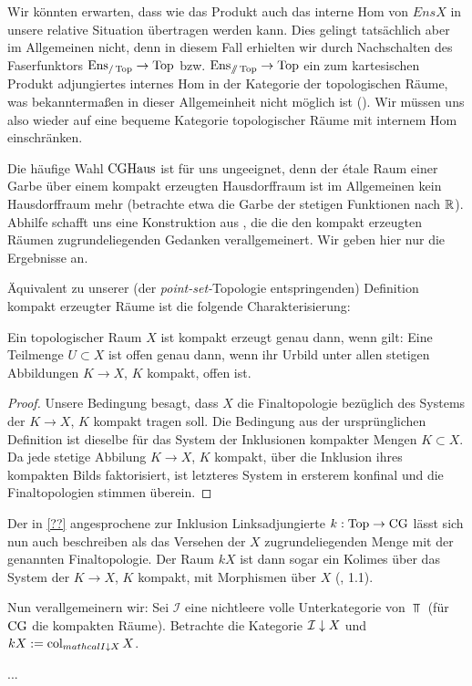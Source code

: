 Wir könnten erwarten, dass wie das Produkt auch das interne Hom von
$EnsX$ in unsere relative Situation übertragen werden kann. Dies
gelingt tatsächlich aber im Allgemeinen nicht, denn in diesem Fall
erhielten wir durch Nachschalten des Faserfunktors $\operatorname{Ens}_{/\operatorname{Top}} \to
\operatorname{Top}$ bzw. $\operatorname{Ens}_{\mathbin{/\mkern-6mu/} \operatorname{Top}} \to \operatorname{Top}$ ein zum kartesischen Produkt
adjungiertes internes Hom in der Kategorie der topologischen Räume,
was bekanntermaßen in dieser Allgemeinheit nicht möglich ist
(\cite{???}). Wir müssen uns also wieder auf eine bequeme Kategorie
topologischer Räume mit internem Hom einschränken.

Die häufige Wahl $\operatorname{CGHaus}$ ist für uns ungeeignet, denn der étale Raum
einer Garbe über einem kompakt erzeugten Hausdorffraum ist im
Allgemeinen kein Hausdorffraum mehr (betrachte etwa die Garbe der
stetigen Funktionen nach $\mathbb{R}$). Abhilfe schafft uns eine Konstruktion
aus \cite{Vogt}, die die den kompakt erzeugten Räumen
zugrundeliegenden Gedanken verallgemeinert. Wir geben hier nur die
Ergebnisse an.

Äquivalent zu unserer (der \emph{point-set-}Topologie entspringenden)
Definition kompakt erzeugter Räume ist die folgende Charakterisierung:
\begin{lemma}
  Ein topologischer Raum $X$ ist kompakt erzeugt genau dann, wenn
  gilt: Eine Teilmenge $U \subset X$ ist offen genau dann, wenn ihr
  Urbild unter allen stetigen Abbildungen $K \to X$, $K$ kompakt,
  offen ist.
\end{lemma}
\begin{proof}
  Unsere Bedingung besagt, dass $X$ die Finaltopologie bezüglich des
  Systems der $K \to X$, $K$ kompakt tragen soll. Die Bedingung aus
  der ursprünglichen Definition ist dieselbe für das System der
  Inklusionen kompakter Mengen $K \subset X$. Da jede stetige Abbilung
  $K \to X$, $K$ kompakt, über die Inklusion ihres kompakten Bilds
  faktorisiert, ist letzteres System in ersterem konfinal und die
  Finaltopologien stimmen überein.
\end{proof}
Der in \ref{??} angesprochene zur Inklusion Linksadjungierte
$k: \operatorname{Top} \to \operatorname{CG}$ lässt sich nun auch beschreiben als das Versehen der
$X$ zugrundeliegenden Menge mit der genannten Finaltopologie. Der Raum
$kX$ ist dann sogar ein Kolimes über das System der $K \to X$, $K$
kompakt, mit Morphismen über $X$ (\cite{Vogt}, 1.1).

Nun verallgemeinern wir: Sei $\mathcal{I}$ eine nichtleere volle
Unterkategorie von $\Top$ (für $\operatorname{CG}$ die kompakten Räume). Betrachte
die Kategorie $\mathcal{I} \downarrow \! {\scriptstyle } \, X$ und $kX
:= \operatorname{col}_{mathcal{I} \downarrow \! {\scriptstyle } \, X} X$.

...








